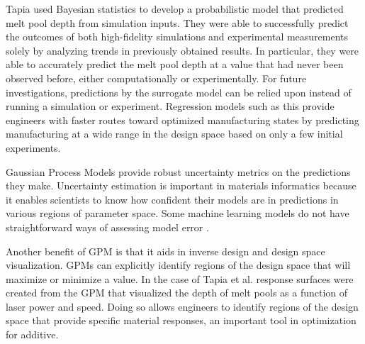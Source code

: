 Tapia used Bayesian statistics to develop a probabilistic model that predicted melt pool depth from simulation inputs. They were able to successfully predict the outcomes of both high-fidelity simulations and experimental measurements solely by analyzing trends in previously obtained results. In particular, they were able to accurately predict the melt pool depth at a value that had never been observed before, either computationally or experimentally. For future investigations, predictions by the surrogate model can be relied upon instead of running a simulation or experiment. Regression models such as this provide engineers with faster routes toward optimized manufacturing states by predicting manufacturing at a wide range in the design space based on only a few initial experiments.

Gaussian Process Models provide robust uncertainty metrics on the predictions they make. Uncertainty estimation is important in materials informatics because it enables scientists to know how confident their models are in predictions in various regions of parameter space. Some machine learning models do not have straightforward ways of assessing model error \cite{Bessa2017}. 

Another benefit of GPM is that it aids in inverse design and design space visualization. GPMs can explicitly identify regions of the design space that will maximize or minimize a value. In the case of Tapia et al. response surfaces were created from the GPM that visualized the depth of melt pools as a function of laser power and speed. Doing so allows engineers to identify regions of the design space that provide specific material responses, an important tool in optimization for additive.


